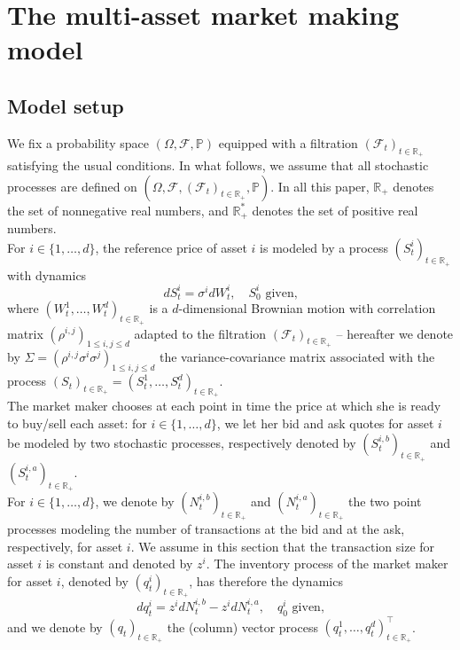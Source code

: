 \documentclass[preprint, 3p]{elsarticle}
\newcommand{\Rr}{{\mathbb{R}}}
\newcommand{\1}{{\chi}}
\def\leq{\leqslant}
\begin{document}
\section{The multi-asset market making model}\label{sec:systemODE}

\subsection{Model setup}
\vspace{3mm}
\label{baseModel}

We fix a probability space $(\Omega,\mathcal F, \mathbb{P})$ equipped with a filtration $(\mathcal{F}_t)_{t\in\Rr_+}$ satisfying the usual conditions. In what follows, we assume that all stochastic processes are defined on $(\Omega,\mathcal F,(\mathcal{F}_t)_{t\in\Rr_+}, \mathbb{P})$. In all this paper, $\mathbb R_+$ denotes the set of nonnegative real numbers, and $\mathbb R_+^*$ denotes the set of positive real numbers.\\

For $i\in \{1,\ldots,d\}$, the reference price of asset $i$ is modeled by a process $(S_t^i)_{t \in \mathbb R_+}$ with dynamics
\[
dS^i_t=\sigma^idW^i_t,\quad \mbox{$S_0^i$ given,}
\]
where $(W_t^1,\ldots,W_t^d)_{t \in \mathbb R_+}$ is a $d$-dimensional Brownian motion with correlation matrix $(\rho^{i,j})_{1\leq i,j\leq d}$  adapted to the filtration $(\mathcal{F}_t)_{t\in \mathbb{R}_+}$ -- hereafter we denote by $\Sigma=(\rho^{i,j}\sigma^i\sigma^j)_{1\leq i,j\leq d}$ the variance-covariance matrix associated with the process $(S_t)_{t \in \mathbb R_+}=(S_t^1,\ldots,S_t^d)_{t \in \mathbb R_+}$.\\

The market maker chooses at each point in time the price at which she is ready to buy/sell each asset: for $i\in \{1,\ldots,d\}$, we let her bid and ask quotes for asset $i$ be modeled by two stochastic processes, respectively denoted by $(S_t^{i,b})_{t \in \mathbb R_+}$  and $(S_t^{i,a})_{t \in \mathbb R_+}$.\\

For $i\in \{1,\ldots,d\}$, we denote by $(N_t^{i,b})_{t \in \mathbb R_+}$ and $(N_t^{i,a})_{t \in \mathbb R_+}$ the two point processes modeling the number of transactions at the bid and at the ask, respectively, for asset $i$. We assume in this section that the transaction size for asset $i$ is constant and denoted by $z^i$. The inventory process of the market maker for asset $i$, denoted by $(q^i_t)_{t \in \mathbb R_+}$, has therefore the dynamics
\[
dq_t^i=z^idN_t^{i,b}-z^idN_t^{i,a},\quad \mbox{$q_0^i$ given,}
\]
and we denote by $(q_t)_{t \in \mathbb R_+}$ the (column) vector process $\left(q^1_t, \ldots, q^d_t \right)^\intercal _{t \in \mathbb R_+}$.\\
\end{document}
